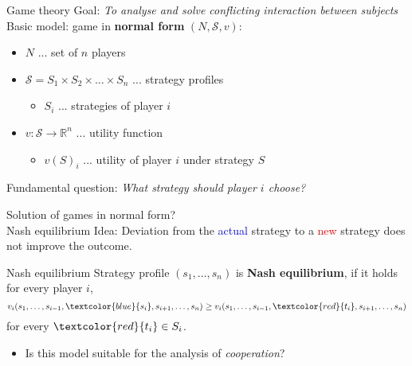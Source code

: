 \documentclass{beamer}
\newcommand{\red}[1]{\textcolor{red}{#1}}
\begin{document}


\begin{frame}{Game theory}
Goal: \textit{To analyse and solve conflicting interaction between subjects}\vspace{0.5in}\\
Basic model: game in \textbf{normal form} $(N,\mathcal{S},v)$:
\begin{itemize}
	\item $N$ ... set of $n$ players
	\item $\mathcal{S} = S_1 \times S_2 \times \dots \times S_n$ ... strategy profiles
	\begin{itemize}
		\item $S_i$ ... strategies of player $i$
	\end{itemize}
	\item $v\colon \mathcal{S} \to \mathbb{R}^n$ ... utility function
	\begin{itemize}
		\item $v(S)_i$ ... utility of player $i$ under strategy $S$
	\end{itemize} 
\end{itemize}
Fundamental question: \textit{What strategy should player $i$ choose?}
\end{frame}



\begin{frame}{Solution of games in normal form?\\ Nash equilibrium}
	Idea: Deviation from the \textcolor{blue}{actual} strategy to a \red{new} strategy does not improve the outcome.\vspace{0.3in}\\
	\begin{block}{Nash equilibrium}
		Strategy profile $(s_1,\dots,s_n)$ is \textbf{Nash equilibrium}, if it holds for every player $i$,
		\[
			v_i(s_1,\dots,s_{i-1},\textcolor{blue}{s_i},s_{i+1},\dots,s_n) \geq v_i(s_1,\dots,s_{i-1},\textcolor{red}{t_i},s_{i+1},\dots,s_n)
		\]
		for every $\textcolor{red}{t_i} \in S_i$.
	\end{block}
	\begin{itemize}
		\item<2-> Is this model suitable for the analysis of \textit{cooperation}?
	\end{itemize}
\end{frame}
\end{document}
